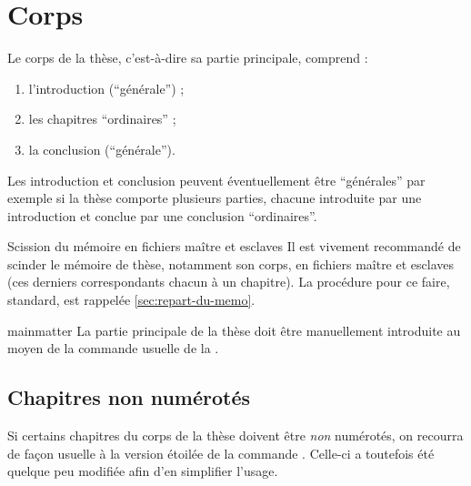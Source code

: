 \chapter{Corps}\label{cha:corps}

Le corps de la thèse, c'est-à-dire sa partie principale, comprend :
\begin{enumerate}
\item l'introduction (\enquote{générale}) ;
\item les chapitres \enquote{ordinaires} ;
\item la conclusion (\enquote{générale}).
\end{enumerate}
Les introduction et conclusion peuvent éventuellement être
\enquote{générales} par exemple si la thèse comporte plusieurs
parties, chacune introduite par une introduction et conclue par
une conclusion \enquote{ordinaires}.

\begin{dbremark}{Scission du mémoire en fichiers maître et esclaves}{}
  Il est vivement recommandé de scinder le mémoire de thèse,
  notamment son corps, en fichiers maître et esclaves (ces derniers
  correspondants chacun à un chapitre). La procédure
  pour ce faire, standard, est rappelée \vref{sec:repart-du-memo}.
\end{dbremark}

\begin{docCommand}[doc description=\mandatory]{mainmatter}{}
  La partie principale de la thèse doit être manuellement introduite au moyen
  de la commande usuelle  de la
  \nofrontmatter.
\end{docCommand}

\section{Chapitres non numérotés}
\label{sec:chap-non-numer}

Si certains chapitres du corps de la thèse  doivent être \emph{non} numérotés, on recourra de
façon usuelle à la version étoilée de la commande
. Celle-ci a toutefois été quelque peu modifiée afin
d'en simplifier l'usage.

